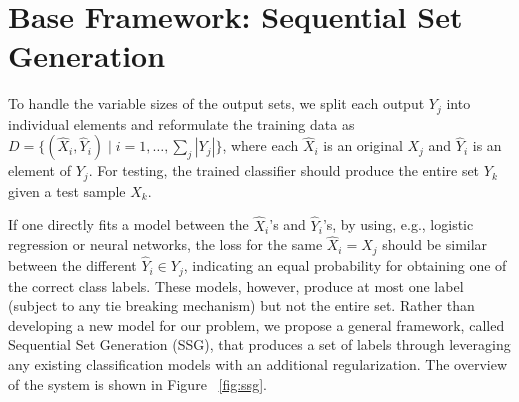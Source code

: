 \documentclass[letterpaper]{article} %
\begin{document}
\section{Base Framework: Sequential Set Generation } 
To handle the variable sizes of the output sets, we split each output $Y_j$ into individual elements and reformulate the training data as $D = \{(\hat{X}_i, \hat{Y}_i) \mid i=1, \ldots, \sum_j|Y_j|\}$, where each $\hat{X}_i$ is an original $X_j$ and $\hat{Y}_i$ is an element of $Y_j$. For testing, the trained classifier should produce the entire set $Y_k$ given a test sample $X_k$.


If one directly fits a model between the $\hat{X}_i$'s and $\hat{Y}_i$'s, by using, e.g., logistic regression or neural networks, the loss for the same $\hat{X}_i=X_j$ should be similar between the different $\hat{Y}_i \in Y_j$, indicating an equal probability for obtaining one of the correct class labels. These models, however, produce at most one label (subject to any tie breaking mechanism) but not the entire set. Rather than developing a new model for our problem, we propose a general framework, called Sequential Set Generation (SSG), that produces a set of labels through leveraging any existing classification models with an additional regularization. The overview of the system is shown in Figure ~\ref{fig:ssg}.
\end{document}
